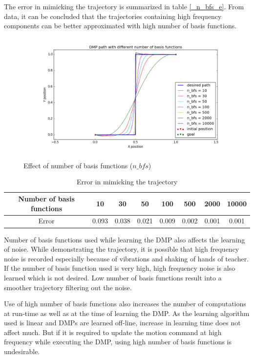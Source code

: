 The error in mimicking the trajectory is summarized in table \ref{_n_bfs_e}. From data, it can be concluded that the trajectories containing high frequency components can be better approximated with high number of basis functions.

\begin{figure}[H]
	\includegraphics[width=\textwidth]{images/n_bfs_.png}
	\caption{Effect of number of basis functions ($n\_bfs$)}
	\label{fig:n_bfs_}
\end{figure}

\begin{center}
	\begin{table}[H]
		\begin{tabular}{| c | c | c | c | c | c | c | c |}	
			\hline
			Number of basis functions & 10 & 30 & 50 & 100 & 500 & 2000 & 10000\\       
			\hline
			Error & 0.093 & 0.038 & 0.021 & 0.009 & 0.002 & 0.001 & 0.001\\
			\hline
		\end{tabular}
		\caption{Error in mimicking the trajectory}
	\end{table}\label{_n_bfs_e}
\end{center}



Number of basis functions used while learning the DMP also affects the learning of noise. While demonstrating the trajectory, it is possible that high frequency noise is recorded especially because of vibrations and shaking of hands of teacher. If the number of basis function used is very high, high frequency noise is also learned which is not desired. Low number of basis functions result into a smoother trajectory filtering out the noise. 

Use of high number of basis functions also increases the number of computations at run-time as well as at the time of learning the DMP. As the learning algorithm used is linear and DMPs are learned off-line, increase in learning time does not affect much. But if it is required to update the motion command at high frequency while executing the DMP, using high number of basis functions is undesirable.     

